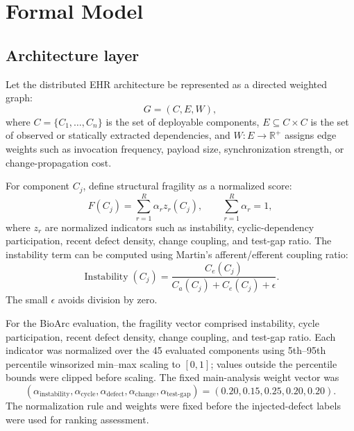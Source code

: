 \documentclass[english,preprint]{elsarticle}
\begin{document}
\section{Formal Model}\label{sec:model}

\subsection{Architecture layer}

Let the distributed EHR architecture be represented as a directed weighted graph:
\begin{equation}
G=(C,E,W),
\label{eq:graph}
\end{equation}
where $C=\{C_1,\ldots,C_n\}$ is the set of deployable components, $E\subseteq C\times C$ is the set of observed or statically extracted dependencies, and $W:E\rightarrow \mathbb{R}^{+}$ assigns edge weights such as invocation frequency, payload size, synchronization strength, or change-propagation cost.

For component $C_j$, define structural fragility as a normalized score:
\begin{equation}
F(C_j)=\sum_{r=1}^{R}\alpha_r z_r(C_j),
\qquad
\sum_{r=1}^{R}\alpha_r=1,
\label{eq:fragility}
\end{equation}
where $z_r$ are normalized indicators such as instability, cyclic-dependency participation, recent defect density, change coupling, and test-gap ratio. The instability term can be computed using Martin's afferent/efferent coupling ratio:
\begin{equation}
\operatorname{Instability}(C_j)=
\frac{C_e(C_j)}{C_a(C_j)+C_e(C_j)+\epsilon}.
\label{eq:instability}
\end{equation}
The small $\epsilon$ avoids division by zero.

For the BioArc evaluation, the fragility vector comprised instability, cycle participation, recent defect density, change coupling, and test-gap ratio. Each indicator was normalized over the 45 evaluated components using 5th--95th percentile winsorized min--max scaling to $[0,1]$; values outside the percentile bounds were clipped before scaling. The fixed main-analysis weight vector was
\begin{equation}
\left(
\alpha_{\mathrm{instability}},
\alpha_{\mathrm{cycle}},
\alpha_{\mathrm{defect}},
\alpha_{\mathrm{change}},
\alpha_{\mathrm{test\mbox{-}gap}}
\right)
=
\left(0.20,0.15,0.25,0.20,0.20\right).
\label{eq:fragility-weights}
\end{equation}
The normalization rule and weights were fixed before the injected-defect labels were used for ranking assessment.
\end{document}
